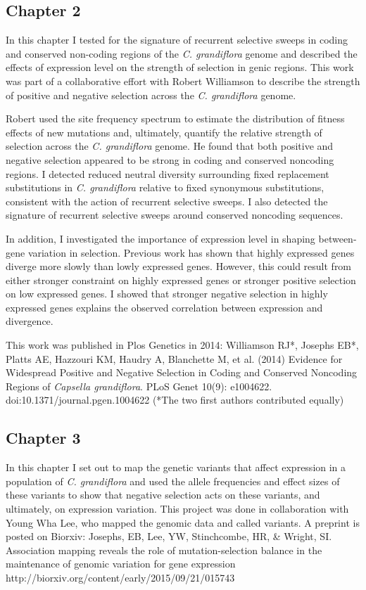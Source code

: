 \subsection{Chapter 2}

In this chapter I tested for the signature of recurrent selective sweeps in coding and conserved non-coding regions of the \textit{C. grandiflora} genome and described the effects of expression level on the strength of selection in genic regions. This work was part of a collaborative effort with Robert Williamson to describe the strength of positive and negative selection across the \textit{C. grandiflora} genome. 

Robert used the site frequency spectrum to estimate the distribution of fitness effects of new mutations and, ultimately, quantify the relative strength of selection across the \textit{C. grandiflora} genome. He found that both positive and negative selection appeared to be strong in coding and conserved noncoding regions. I detected reduced neutral diversity surrounding fixed replacement substitutions in \textit{C. grandiflora} relative to fixed synonymous substitutions, consistent with the action of recurrent selective sweeps. I also detected the signature of recurrent selective sweeps around conserved noncoding sequences.

In addition, I investigated the importance of expression level in shaping between-gene variation in selection. Previous work has shown that highly expressed genes diverge more slowly than lowly expressed genes. However, this could result from either stronger constraint on highly expressed genes or stronger positive selection on low expressed genes. I showed that stronger negative selection in highly expressed genes explains the observed correlation between expression and divergence.

This work was published in Plos Genetics in 2014: Williamson RJ*, Josephs EB*, Platts AE, Hazzouri KM, Haudry A, Blanchette M, et al. (2014) Evidence for Widespread Positive and Negative Selection in Coding and Conserved Noncoding Regions of \textit{Capsella grandiflora}. PLoS Genet 10(9): e1004622. doi:10.1371/journal.pgen.1004622 (*The two first authors contributed equally)

\subsection{Chapter 3}
	In this chapter I set out to map the genetic variants that affect expression in a population of \textit{C. grandiflora} and used the allele frequencies and effect sizes of these variants to show that negative selection acts on these variants, and ultimately, on expression variation. This project was done in collaboration with Young Wha Lee, who mapped the genomic data and called variants. A preprint is posted on Biorxiv: Josephs, EB, Lee, YW, Stinchcombe, HR, \& Wright, SI. Association mapping reveals the role of mutation-selection balance in the maintenance of genomic variation for gene expression  http://biorxiv.org/content/early/2015/09/21/015743

